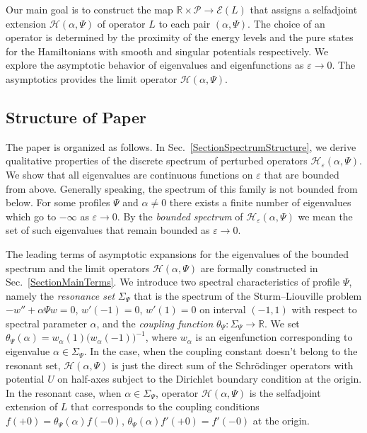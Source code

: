 \documentclass[11pt,english]{amsart}%
\begin{document}
Our main goal is to construct the map $\mathbb R\times
\mathcal{P}\longrightarrow \mathcal{E}(L)$ that assigns a selfadjoint extension  $\mathcal{H}(\alpha,\Psi)$ of operator $L$ to each pair $(\alpha,\Psi)$. The choice of an operator is determined by the proximity
of the energy levels and the pure states for the Hamiltonians with smooth and singular potentials respectively.
We explore the asymptotic behavior of eigenvalues and eigenfunctions as $\varepsilon\to 0$. The asymptotics provides the limit operator  $\mathcal{H}(\alpha,\Psi)$.

\subsection{Structure of Paper}

The paper is organized as follows. In Sec.~\ref{SectionSpectrumStructure}, we derive  qualitative properties of the discrete spectrum of
perturbed operators  $\mathcal{H}_\varepsilon(\alpha,\Psi)$. We show that all eigenvalues are  continuous functions on  $\varepsilon$ that are bounded from above. Generally speaking, the spectrum of this family is not bounded from below. For some profiles $\Psi$ and $\alpha\neq 0$ there exists a finite number of eigenvalues which go to  $-\infty$ as $\varepsilon\to 0$. By the \emph{bounded spectrum} of $\mathcal{H}_\varepsilon(\alpha,\Psi)$ we mean the set of such eigenvalues  that remain bounded as $\varepsilon\to 0$.

The leading terms of asymptotic expansions for the eigenvalues of the bounded spectrum  and the limit operators $\mathcal{H}(\alpha,\Psi)$ are formally constructed in Sec.~\ref{SectionMainTerms}. We introduce two spectral characteristics of profile $\Psi$, namely the \emph{resonance set} $\Sigma_\Psi$ that is the spectrum of the Sturm--Liouville problem $-w''+\alpha \Psi w=0$, $w'(-1)=0$, $w'(1)=0$ on interval $(-1,1)$ with respect to spectral parameter $\alpha$,  and the \emph{coupling function}  $\theta_\Psi
\colon\Sigma_\Psi \to \mathbb{R}$. We set $\theta_\Psi (\alpha)=w_\alpha(1)\bigl(w_\alpha(-1)\bigr)^{-1}$, where
$w_\alpha$ is an eigenfunction corresponding to eigenvalue $\alpha\in \Sigma_\Psi$.
In the case, when the coupling constant doesn't belong to the resonant set, $\mathcal{H}(\alpha,\Psi)$ is just the direct sum  of the  Schr\"odinger operators with potential $U$
on half-axes subject to the Dirichlet boundary condition at the origin.
In the resonant case, when $\alpha\in \Sigma_\Psi$, operator $\mathcal{H}(\alpha,\Psi)$ is the selfadjoint extension of $L$ that corresponds to the coupling conditions
$ f(+0)=\theta_\Psi (\alpha)f(-0)$, $\theta_\Psi
(\alpha)f'(+0)=f'(-0)$ at the origin.
\end{document}
